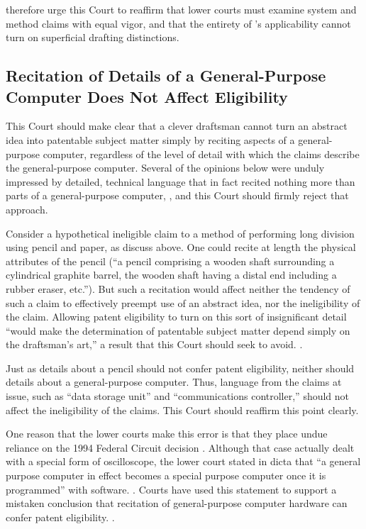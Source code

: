 \documentclass{scotus}
\begin{document}
\Amici therefore urge this Court to reaffirm that lower courts must examine
system and method claims with equal vigor, and that the entirety of
’s applicability cannot turn on superficial drafting distinctions.  



%
%
\subsection{Recitation of Details of a General-Purpose Computer Does Not Affect
Eligibility}

This Court should make clear that a clever draftsman cannot turn an abstract
idea into patentable subject matter simply by reciting
aspects of a general-purpose computer, regardless of the level of detail with
which the claims describe the general-purpose computer. Several of the opinions
below were unduly impressed by detailed, technical language that in fact recited
nothing more than parts of a general-purpose computer, , and this Court should firmly reject that approach.

Consider a hypothetical ineligible claim to a method of performing long
division using pencil and paper, as \amici discuss above. One could
recite at length the physical attributes of the pencil (``a pencil
comprising a wooden shaft surrounding a cylindrical graphite barrel, the wooden
shaft having a distal end including a rubber eraser, etc.''). But such a
recitation would affect neither the tendency of such a claim to effectively
preempt use of an abstract idea, nor the ineligibility of the claim. Allowing
patent eligibility to turn on this sort of insignificant detail ``would make the
determination of patentable subject matter depend simply on the draftsman's
art,'' a result that this Court should seek to avoid. .

Just as details about a pencil should not confer patent
eligibility, neither should details about a general-purpose
computer.
Thus, language from the claims at issue, such as
``data storage unit'' and ``communications controller,'' should not affect the
ineligibility of the claims. This Court should reaffirm this point clearly.

One reason that the lower courts make this error is that they place undue
reliance on the 1994 Federal Circuit decision . Although that
case actually dealt with a special form of oscilloscope,
the lower court stated in dicta
that ``a general purpose computer in effect becomes a special purpose computer
once it is programmed'' with software. .
Courts have used this statement to support a mistaken conclusion that recitation
of general-purpose computer hardware can confer patent eligibility.
.
\end{document}
